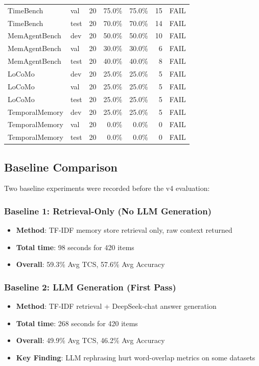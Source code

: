 \documentclass[11pt,a4paper]{article}
\begin{document}
\begin{table}[H]
\begin{tabular}{@{}llrrrrl@{}}
TimeBench      & val   & 20 & 75.0\%  & 75.0\%  & 15 & FAIL \\
TimeBench      & test  & 20 & 70.0\%  & 70.0\%  & 14 & FAIL \\
\midrule
MemAgentBench  & dev   & 20 & 50.0\%  & 50.0\%  & 10 & FAIL \\
MemAgentBench  & val   & 20 & 30.0\%  & 30.0\%  & 6  & FAIL \\
MemAgentBench  & test  & 20 & 40.0\%  & 40.0\%  & 8  & FAIL \\
\midrule
LoCoMo         & dev   & 20 & 25.0\%  & 25.0\%  & 5  & FAIL \\
LoCoMo         & val   & 20 & 25.0\%  & 25.0\%  & 5  & FAIL \\
LoCoMo         & test  & 20 & 25.0\%  & 25.0\%  & 5  & FAIL \\
\midrule
TemporalMemory & dev   & 20 & 25.0\%  & 25.0\%  & 5  & FAIL \\
TemporalMemory & val   & 20 & 0.0\%   & 0.0\%   & 0  & FAIL \\
TemporalMemory & test  & 20 & 0.0\%   & 0.0\%   & 0  & FAIL \\
\bottomrule
\end{tabular}
\end{table}

\subsection{Baseline Comparison}

Two baseline experiments were recorded before the v4 evaluation:

\subsubsection{Baseline 1: Retrieval-Only (No LLM Generation)}
\begin{itemize}
    \item \textbf{Method}: TF-IDF memory store retrieval only, raw context returned
    \item \textbf{Total time}: 98 seconds for 420 items
    \item \textbf{Overall}: 59.3\% Avg TCS, 57.6\% Avg Accuracy
\end{itemize}

\subsubsection{Baseline 2: LLM Generation (First Pass)}
\begin{itemize}
    \item \textbf{Method}: TF-IDF retrieval + DeepSeek-chat answer generation
    \item \textbf{Total time}: 268 seconds for 420 items
    \item \textbf{Overall}: 49.9\% Avg TCS, 46.2\% Avg Accuracy
    \item \textbf{Key Finding}: LLM rephrasing hurt word-overlap metrics on some datasets
\end{itemize}
\end{document}
